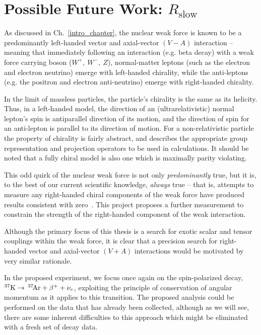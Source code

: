%
\FloatBarrier
\section{Possible Future Work:  $R_{\textrm{slow}}$}
\label{section_rslow}
As discussed in Ch.~\ref{intro_chapter}, the nuclear weak force is known to be a predominantly left-handed vector and axial-vector $(V-A)$ interaction -- meaning that immediately following an interaction (e.g. beta decay) with a weak force carrying boson ($W^+,\: W^-,\: Z$), 
normal-matter leptons (such as the electron and electron neutrino) emerge with left-handed chirality,
while the anti-leptons (e.g. the positron and electron anti-neutrino) emerge with right-handed chirality.  

In the limit of massless particles, the particle's chirality is the same as its helicity. Thus, in a left-handed model, the direction of an (ultrarelativistic) normal lepton's spin is antiparallel direction of its motion, and the direction of spin for an anti-lepton is parallel to its direction of motion.  For a non-relativistic particle the property of chirality is fairly abstract, and describes the appropriate group representation and projection operators to be used in calculations.  It should be noted that a fully chiral model is also one which is maximally parity violating.

This odd quirk of the nuclear weak force is not only \emph{predominantly} true, but it is, to the best of our current scientific knowledge, \emph{always} true -- that is, attempts to measure any right-handed chiral components of the weak force have produced results consistent with zero~\cite{severijns_beck_cuncic_2006}\cite{severijns_cuncic_2011}.  This project proposes a further measurement to constrain the strength of the right-handed component of the weak interaction.  

Although the primary focus of this thesis is a search for exotic scalar and tensor couplings within the weak force, it is clear that a precision search for right-handed vector and axial-vector $(V+A)$ interactions would be motivated by very similar rationale.

In the proposed experiment, we focus once again on the spin-polarized decay, \mbox{$^{37}\textrm{K} \rightarrow \,^{37}\textrm{\!Ar} + \beta^{+} + \nu_e$}, exploiting the principle of conservation of angular momentum as it applies to this transition.  The proposed analysis could be performed on the data that has already been collected, although as we will see, there are some inherent difficulties to this approach which might be eliminated with a fresh set of decay data.



